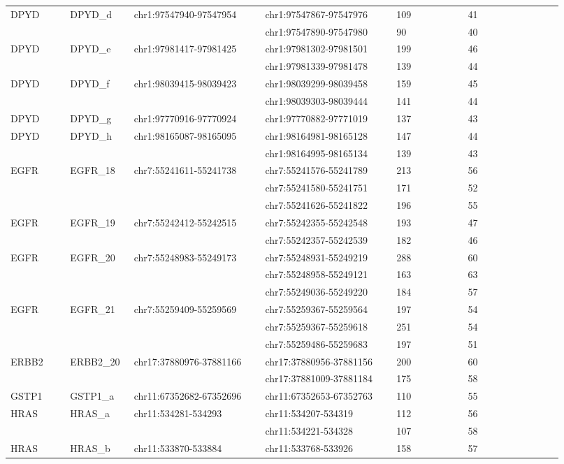 \begin{landscape}
\begin{longtable}{p{0.1\linewidth}|p{0.1\linewidth}p{0.22\linewidth}p{0.22\linewidth}p{0.12\linewidth}p{0.16\linewidth}}
\\
DPYD & DPYD\_d & chr1:97547940-97547954 & chr1:97547867-97547976 & 109 & 41
\\
 & & & chr1:97547890-97547980 & 90 & 40
\\
DPYD & DPYD\_e & chr1:97981417-97981425 & chr1:97981302-97981501 & 199 & 46
\\
 & & & chr1:97981339-97981478 & 139 & 44
\\
DPYD & DPYD\_f & chr1:98039415-98039423 & chr1:98039299-98039458 & 159 & 45
\\
 & & & chr1:98039303-98039444 & 141 & 44
\\
DPYD & DPYD\_g & chr1:97770916-97770924 & chr1:97770882-97771019 & 137 & 43
\\
DPYD & DPYD\_h & chr1:98165087-98165095 & chr1:98164981-98165128 & 147 & 44
\\
 & & & chr1:98164995-98165134 & 139 & 43
\\
\hline
EGFR & EGFR\_18 & chr7:55241611-55241738 & chr7:55241576-55241789 & 213 & 56
\\
 & & & chr7:55241580-55241751 & 171 & 52
\\
 & & & chr7:55241626-55241822 & 196 & 55
\\
EGFR & EGFR\_19 & chr7:55242412-55242515 & chr7:55242355-55242548 & 193 & 47
\\
 & & & chr7:55242357-55242539 & 182 & 46
\\
EGFR & EGFR\_20 & chr7:55248983-55249173 & chr7:55248931-55249219 & 288 & 60
\\
 & & & chr7:55248958-55249121 & 163 & 63
\\
 & & & chr7:55249036-55249220 & 184 & 57
\\
EGFR & EGFR\_21 & chr7:55259409-55259569 & chr7:55259367-55259564 & 197 & 54
\\
 & & & chr7:55259367-55259618 & 251 & 54
\\
 & & & chr7:55259486-55259683 & 197 & 51
\\
\hline
ERBB2 & ERBB2\_20 & chr17:37880976-37881166 & chr17:37880956-37881156 & 200 & 60
\\
 & & & chr17:37881009-37881184 & 175 & 58
\\
\hline
GSTP1 & GSTP1\_a & chr11:67352682-67352696 & chr11:67352653-67352763 & 110 & 55
\\
\hline
HRAS & HRAS\_a & chr11:534281-534293 & chr11:534207-534319 & 112 & 56
\\
 & & & chr11:534221-534328 & 107 & 58
\\
HRAS & HRAS\_b & chr11:533870-533884 & chr11:533768-533926 & 158 & 57

\end{longtable}
\end{landscape}
